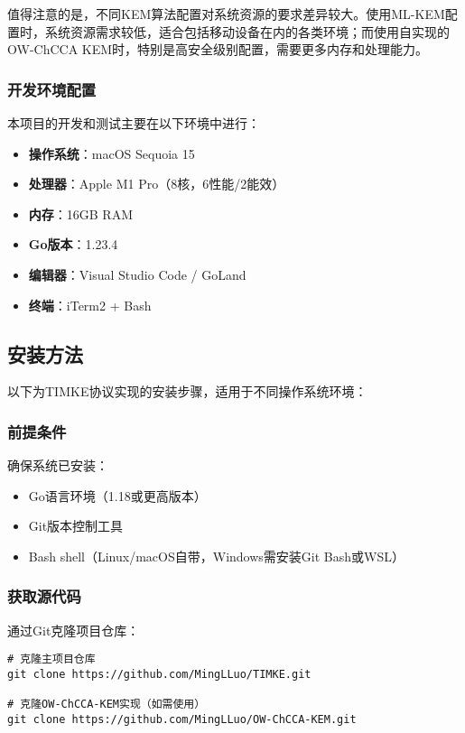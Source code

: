 值得注意的是，不同KEM算法配置对系统资源的要求差异较大。使用ML-KEM配置时，系统资源需求较低，适合包括移动设备在内的各类环境；而使用自实现的OW-ChCCA KEM时，特别是高安全级别配置，需要更多内存和处理能力。

\subsubsection{开发环境配置}

本项目的开发和测试主要在以下环境中进行：

\begin{itemize}
    \item \textbf{操作系统}：macOS Sequoia 15
    \item \textbf{处理器}：Apple M1 Pro（8核，6性能/2能效）
    \item \textbf{内存}：16GB RAM
    \item \textbf{Go版本}：1.23.4
    \item \textbf{编辑器}：Visual Studio Code / GoLand
    \item \textbf{终端}：iTerm2 + Bash
\end{itemize}

\subsection{安装方法}

以下为TIMKE协议实现的安装步骤，适用于不同操作系统环境：

\subsubsection{前提条件}

确保系统已安装：
\begin{itemize}
    \item Go语言环境（1.18或更高版本）
    \item Git版本控制工具
    \item Bash shell（Linux/macOS自带，Windows需安装Git Bash或WSL）
\end{itemize}

\subsubsection{获取源代码}

通过Git克隆项目仓库：
\begin{verbatim}
# 克隆主项目仓库
git clone https://github.com/MingLLuo/TIMKE.git

# 克隆OW-ChCCA-KEM实现（如需使用）
git clone https://github.com/MingLLuo/OW-ChCCA-KEM.git
\end{verbatim}

